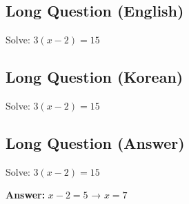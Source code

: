 \cleardoublepage
\subsection*{Long Question (English)}
Solve: $3(x - 2) = 15$


\newpage
\subsection*{Long Question (Korean)}
Solve: $3(x - 2) = 15$


\newpage
\subsection*{Long Question (Answer)}
Solve: $3(x - 2) = 15$

\textbf{Answer:} $x - 2 = 5$ → $x = 7$
